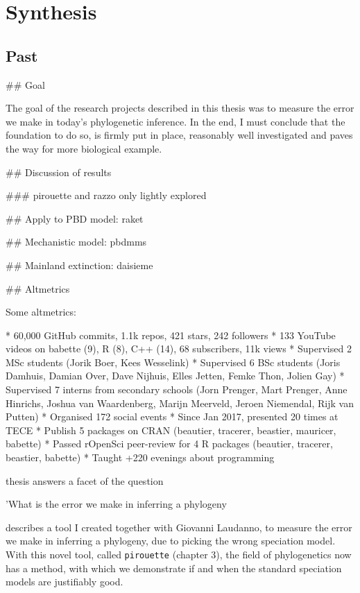 \chapter{Synthesis}
\label{synthesis}
\newpage

\section{Past}

\noindent

## Goal 

The goal of the research projects
described in this thesis 
was to measure the error we make in today's phylogenetic inference.
In the end, I must conclude that the foundation to do so, is firmly 
put in place, reasonably well investigated and paves the way for
more biological example.

## Discussion of results

### pirouette and razzo only lightly explored


## Apply to PBD model: raket

## Mechanistic model: pbdmms

## Mainland extinction: daisieme

## Altmetrics

Some altmetrics:

 * 60,000 GitHub commits, 1.1k repos, 421 stars, 242 followers
 * 133 YouTube videos on babette (9), R (8), C++ (14), 68 subscribers, 11k views
 * Supervised 2 MSc students (Jorik Boer, Kees Wesselink)
 * Supervised 6 BSc students (Joris Damhuis, 
   Damian Over, Dave Nijhuis, Elles Jetten, Femke Thon, Jolien Gay)
 * Supervised 7 interns from secondary schools (Jorn Prenger, Mart Prenger, 
   Anne Hinrichs, Joshua van Waardenberg, Marijn Meerveld, Jeroen Niemendal, 
   Rijk van Putten)
 * Organised 172 social events
 * Since Jan 2017, presented 20 times at TECE
 * Publish 5 packages on CRAN (beautier, tracerer, beastier, mauricer, babette)
 * Passed rOpenSci peer-review for 4 R packages (beautier, tracerer, beastier, babette)
 * Taught +220 evenings about programming

 thesis answers a facet of the question 


'What is the error we make in inferring a phylogeny

describes a tool I created together with Giovanni Laudanno, 
to measure the error we make in inferring a phylogeny, due to
picking the wrong speciation model. 
With this novel tool, called \verb;pirouette; (chapter 3),
the field of phylogenetics now has a method, 
with which we demonstrate if and when the standard speciation models
are justifiably good. 

